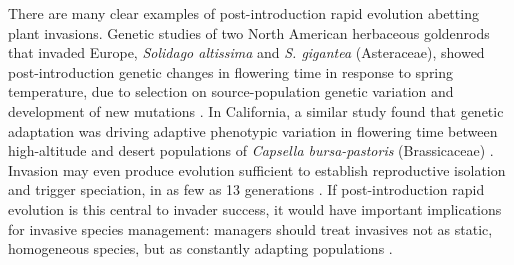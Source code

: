 \documentclass[12pt]{article}\usepackage[]{graphicx}\usepackage[]{color}
\begin{document}
	There are many clear examples of post-introduction rapid evolution abetting plant invasions. Genetic studies of two North American herbaceous goldenrods that invaded Europe, \textit{Solidago altissima} and \textit{S. gigantea} (Asteraceae), showed post-introduction genetic changes in flowering time in response to spring temperature, due to selection on source-population genetic variation and development of new mutations \parencite{Weber1998}. %
In California, a similar study found that genetic adaptation was driving adaptive phenotypic variation in flowering time between high-altitude and desert populations of \textit{Capsella bursa-pastoris} (Brassicaceae) \parencite{Linde2001}. Invasion may even produce evolution sufficient to establish reproductive isolation and trigger speciation, in as few as 13 generations \parencite{Hendry2000}. If post-introduction rapid evolution is this central to invader success, it would have important implications for invasive species management: managers should treat invasives not as static, homogeneous species, but as constantly adapting populations \parencite{Lee2002invasion}. %
	
\end{document}
